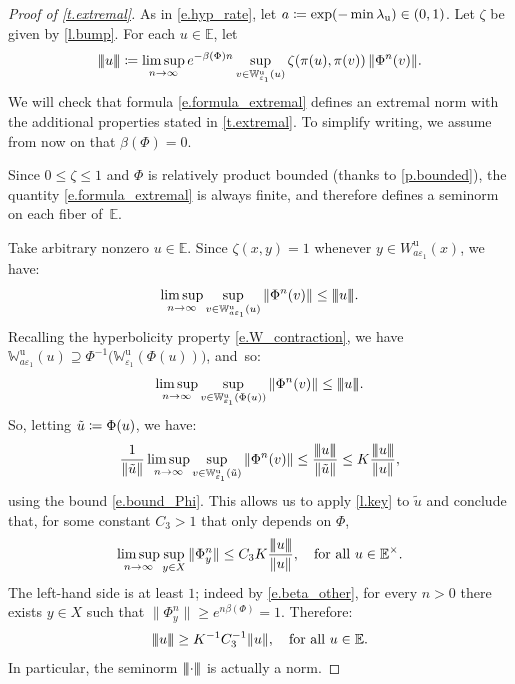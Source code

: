 \documentclass[10pt]{amsart}
\def\vcentcolon{\mathrel{\mathop\ordinarycolon}}
\providecommand\ordinarycolon{:}
\providecommand*\coloneqq{\vcentcolon\mathrel{\mkern-1.2mu}=}
\theoremstyle{plain}
\theoremstyle{definition}
\newcommand{\tribar}[1]{\mathopen{| {\kern -1.5pt} | {\kern -1.5pt} |} {#1}
\mathclose{| {\kern -1.5pt} | {\kern -1.5pt} |}}
\newcommand{\EE}{\mathbb{E}}
\newcommand{\WW}{\mathbb{W}}
\newcommand{\uu}{\mathrm{u}}
\let\epsilon\varepsilon
\begin{document}
\begin{proof}[Proof of \cref{t.extremal}]
As in \eqref{e.hyp_rate}, let $a \coloneqq \exp(-\min \lambda_\uu) \in (0,1)$.
Let $\zeta$ be given by \cref{l.bump}.
For each $u \in \EE$, let
\begin{equation}\label{e.formula_extremal}
\tribar{u} \coloneqq \limsup_{n \to \infty} e^{-\beta(\Phi) n} \sup_{v \in \WW^\uu_{\epsilon_1}(u)} \zeta(\pi(u),\pi(v)) \, \| \Phi^n (v) \|.
\end{equation}
We will check that formula \eqref{e.formula_extremal} defines an extremal norm with the additional properties stated in \cref{t.extremal}.
To simplify writing, we assume from now on that $\beta(\Phi) = 0$.

Since $0 \le \zeta \le 1$ and $\Phi$ is relatively product bounded (thanks to \cref{p.bounded}), the quantity \eqref{e.formula_extremal} is always finite, and therefore defines a seminorm on each fiber of~$\EE$.

Take arbitrary nonzero $u \in \EE$.
Since $\zeta(x,y) = 1$ whenever $y \in W^\uu_{a \epsilon_1}(x)$, we have:
\[
\limsup_{n \to \infty} \sup_{v \in \WW^\uu_{a\epsilon_1}(u)} \| \Phi^n (v) \| \le \tribar{u}.
\]
Recalling the hyperbolicity property \eqref{e.W_contraction}, we have $\WW^\uu_{a \epsilon_1}(u)\!\supseteq\!\Phi^{-1}\big(\WW^\uu_{\epsilon_1}(\Phi(u))\big)$, and~so:
\begin{equation}\label{e.nice1}
\limsup_{n \to \infty} \sup_{v \in \WW^\uu_{\epsilon_1}(\Phi(u))} \| \Phi^n (v) \| \le \tribar{u}.
\end{equation}
So, letting $\tilde u \coloneqq \Phi(u)$, we have:
\[
\frac{1}{\|\tilde u\|}
\limsup_{n \to \infty} \sup_{v \in \WW^\uu_{\epsilon_1}(\tilde u)} \| \Phi^n (v) \| \le \frac{\tribar{u}}{\|\tilde u\|} \le K \frac{\tribar{u}}{\|u\|},
\]
using the bound \eqref{e.bound_Phi}.
This allows us to apply \cref{l.key} to $\tilde u$ and conclude that, for some constant $C_3>1$ that only depends on $\Phi$,
\begin{equation}\label{e.nice2}
\limsup_{n \to \infty} \sup_{y \in X} \|\Phi^n_y \| \le C_3 K \frac{\tribar{u}}{\|u\|}, \quad\text{for all } u \in \EE^\times.
\end{equation}
The left-hand side is at least $1$; indeed by \eqref{e.beta_other}, for every $n>0$ there exists $y \in X$ such that $\|\Phi^n_y \| \ge e^{n\beta(\Phi)} = 1$.
Therefore:
\begin{equation}\label{e.comparison_below}
\tribar{u} \ge K^{-1} C_3^{-1} \|u\|, \quad\text{for all } u \in \EE.
\end{equation}
In particular, the seminorm $\tribar{\mathord{\cdot}}$ is actually a norm.


\end{proof}
\end{document}
